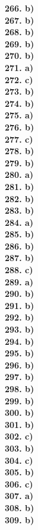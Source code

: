 \documentclass[8pt]{extarticle}
\begin{document}
\begin{multicols}{8}
\textbf{266. b)} \\
\textbf{267. b)} \\
\textbf{268. b)} \\
\textbf{269. b)} \\
\textbf{270. b)} \\
\textbf{271. a)} \\
\textbf{272. c)} \\
\textbf{273. b)} \\
\textbf{274. b)} \\
\textbf{275. a)} \\
\textbf{276. b)} \\
\textbf{277. c)} \\
\textbf{278. b)} \\
\textbf{279. b)} \\
\textbf{280. a)} \\
\textbf{281. b)} \\
\textbf{282. b)} \\
\textbf{283. b)} \\
\textbf{284. a)} \\
\textbf{285. b)} \\
\textbf{286. b)} \\
\textbf{287. b)} \\
\textbf{288. c)} \\
\textbf{289. a)} \\
\textbf{290. b)} \\
\textbf{291. b)} \\
\textbf{292. b)} \\
\textbf{293. b)} \\
\textbf{294. b)} \\
\textbf{295. b)} \\
\textbf{296. b)} \\
\textbf{297. b)} \\
\textbf{298. b)} \\
\textbf{299. b)} \\
\textbf{300. b)} \\
\textbf{301. b)} \\
\textbf{302. c)} \\
\textbf{303. b)} \\
\textbf{304. c)} \\
\textbf{305. b)} \\
\textbf{306. c)} \\
\textbf{307. a)} \\
\textbf{308. b)} \\
\textbf{309. b)} \\

\end{multicols}
\end{document}
